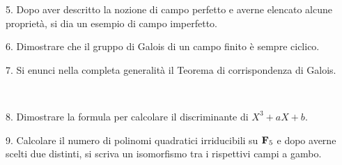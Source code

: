 \item{5.} Dopo aver descritto la nozione di campo perfetto e averne elencato alcune propriet\`{a}, si dia un esempio di campo imperfetto.
\ve\ \vs

\item{6.} Dimostrare che il gruppo di Galois di un campo finito \`{e} sempre ciclico.

\vv \item{7.} Si enunci nella completa generalit\`a il Teorema di
corrispondenza di Galois.

\ve\ \vs


\item{8.} Dimostrare la formula per calcolare il discriminante di $X^3+aX+b$.

\vv

\item{9.} Calcolare il numero di polinomi quadratici irriducibili su ${\bf F}_5$ e dopo averne scelti due distinti, si scriva un
isomorfismo tra i rispettivi campi a gambo.

\ \vst
 \bye
